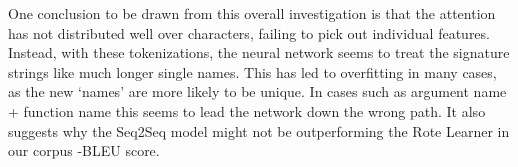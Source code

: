 \begin{table}
\centering
{}
    \caption{Three translations and attentions for an example of some the attentions of from the Name + Other Arguments on the tokenization on a Seq-to-Seq model trained on the Full Random-Split Dataset. Here is shows that, on the Full Random-Split Dataset, the most important feature is variable name, and the model attends solely to that, but that the hidden state of the LSTM still takes into account characters after the variable input }
    \label{fig:otherarg_attn_full_dataset}
\end{table}

One conclusion to be drawn from this overall investigation is that the attention has not distributed well over characters, failing to pick out individual features. Instead, with these tokenizations, the neural network seems to treat the signature strings like much longer single names. 
This has led to overfitting in many cases, as the new `names' are more likely to be unique. In cases such as argument name + function name this seems to lead the network down the wrong path. It also suggests why the Seq2Seq model might not be outperforming  the Rote Learner in our corpus -BLEU score. 

